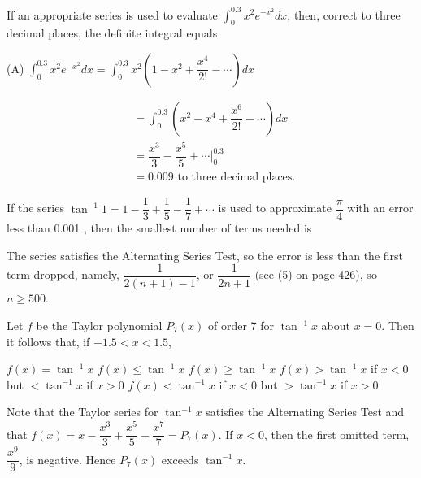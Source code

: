 \question
If an appropriate series is used to evaluate $\displaystyle\int_{0}^{0.3} x^{2} e^{-x^{2}} d x$, then, correct to three decimal places, the definite integral equals
\begin{choices}
\end{choices}
\begin{solution}
(A) $\displaystyle\int_{0}^{0.3} x^{2} e^{-x^{2}} d x=\displaystyle\int_{0}^{0.3} x^{2}\left(1-x^{2}+\dfrac{x^{4}}{2!}-\cdots\right) d x$

\[
\begin{aligned}
& =\displaystyle\int_{0}^{0.3}\left(x^{2}-x^{4}+\dfrac{x^{6}}{2!}-\cdots\right) d x \\
& =\dfrac{x^{3}}{3}-\dfrac{x^{5}}{5}+\left.\cdots\right|_{0} ^{0.3} \\
& =0.009 \text { to three decimal places. }
\end{aligned}
\]


\end{solution}

\question
If the series $\tan ^{-1} 1=1-\dfrac{1}{3}+\dfrac{1}{5}-\dfrac{1}{7}+\cdots$ is used to approximate $\dfrac{\pi}{4}$ with an error less than 0.001 , then the smallest number of terms needed is
\begin{choices}
\end{choices}
\begin{solution}
The series satisfies the Alternating Series Test, so the error is less than the first term dropped, namely, $\dfrac{1}{2(n+1)-1}$, or $\dfrac{1}{2 n+1}$ (see (5) on page 426), so $n \geqslant 500$.
\end{solution}



\newpage




\question\label{calc10:tan-p7}
Let $f$ be the Taylor polynomial $P_{7}(x)$ of order 7 for $\tan ^{-1} x$ about $x=0$. Then it follows that, if $-1.5<x<1.5$,
\begin{choices}
  \choice $f(x)=\tan ^{-1} x$
  \choice $f(x) \leqslant \tan ^{-1} x$
  \choice $f(x) \geqslant \tan ^{-1} x$
  \CorrectChoice $f(x)>\tan ^{-1} x$ if $x<0$ but $<\tan ^{-1} x$ if $x>0$
  \choice $f(x)<\tan ^{-1} x$ if $x<0$ but $>\tan ^{-1} x$ if $x>0$
\end{choices}
\begin{solution}
Note that the Taylor series for $\tan ^{-1} x$ satisfies the Alternating Series Test and that $f(x)=x-\dfrac{x^{3}}{3}+\dfrac{x^{5}}{5}-\dfrac{x^{7}}{7}=P_{7}(x)$. If $x<0$, then the first omitted term, $\dfrac{x^{9}}{9}$, is negative. Hence $P_{7}(x)$ exceeds $\tan ^{-1} x$.
\end{solution}

